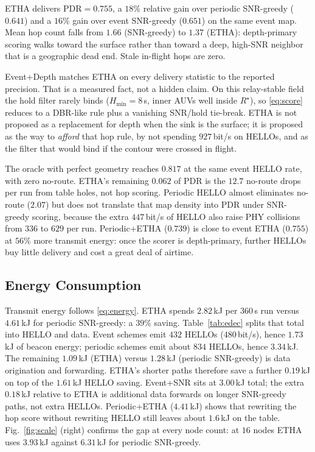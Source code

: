\documentclass[journal]{IEEEtran}
\begin{document}
ETHA delivers $\mathrm{PDR}=0.755$, a $18\%$ relative gain over
periodic SNR-greedy ($0.641$) and a $16\%$ gain over event SNR-greedy
($0.651$) on the same event map. Mean hop count falls from $1.66$
(SNR-greedy) to $1.37$ (ETHA): depth-primary scoring walks toward the
surface rather than toward a deep, high-SNR neighbor that is a
geographic dead end. Stale in-flight hops are zero.

Event+Depth matches ETHA on every delivery statistic to the reported
precision. That is a measured fact, not a hidden claim. On this
relay-stable field the hold filter rarely binds ($H_{\min}=8$\,s,
inner AUVs well inside $R^{\star}$), so \eqref{eq:score} reduces to
a DBR-like rule plus a vanishing SNR/hold tie-break. ETHA is not
proposed as a replacement for depth when the sink is the surface; it
is proposed as the way to \emph{afford} that hop rule, by not spending
$927$\,bit/s on HELLOs, and as the filter that would bind if the
contour were crossed in flight.

The oracle with perfect geometry reaches $0.817$ at the same event
HELLO rate, with zero no-route. ETHA's remaining $0.062$ of PDR is
the $12.7$ no-route drops per run from table holes, not hop scoring.
Periodic HELLO almost eliminates no-route ($2.07$) but does not
translate that map density into PDR under SNR-greedy scoring, because
the extra $447$\,bit/s of HELLO also raise PHY collisions from $336$
to $629$ per run. Periodic+ETHA ($0.739$) is close to event ETHA
($0.755$) at $56\%$ more transmit energy: once the scorer is
depth-primary, further HELLOs buy little delivery and cost a great
deal of airtime.

\subsection{Energy Consumption}
Transmit energy follows \eqref{eq:energy}. ETHA spends $2.82$\,kJ per
$360$\,s run versus $4.61$\,kJ for periodic SNR-greedy: a $39\%$
saving. Table~\ref{tab:edec} splits that total into HELLO and data.
Event schemes emit $432$ HELLOs ($480$\,bit/s), hence $1.73$\,kJ of
beacon energy; periodic schemes emit about $834$ HELLOs, hence
$3.34$\,kJ. The remaining $1.09$\,kJ (ETHA) versus $1.28$\,kJ
(periodic SNR-greedy) is data origination and forwarding. ETHA's
shorter paths therefore save a further $0.19$\,kJ on top of the
$1.61$\,kJ HELLO saving. Event+SNR sits at $3.00$\,kJ total; the extra
$0.18$\,kJ relative to ETHA is additional data forwards on longer
SNR-greedy paths, not extra HELLOs. Periodic+ETHA ($4.41$\,kJ) shows
that rewriting the hop score without rewriting HELLO still leaves
about $1.6$\,kJ on the table.
Fig.~\ref{fig:scale} (right) confirms the gap at every node count:
at $16$ nodes ETHA uses $3.93$\,kJ against $6.31$\,kJ for periodic
SNR-greedy.
\end{document}
